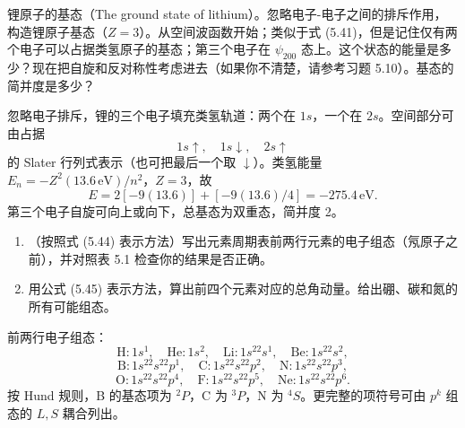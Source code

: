 \begin{question}
锂原子的基态（The ground state of lithium）。忽略电子-电子之间的排斥作用，构造锂原子基态（$Z=3$）。从空间波函数开始；类似于式 (5.41)，但是记住仅有两个电子可以占据类氢原子的基态；第三个电子在 $\psi_{200}$ 态上。这个状态的能量是多少？现在把自旋和反对称性考虑进去（如果你不清楚，请参考习题 5.10）。基态的简并度是多少？

\par\smallskip
{}

\end{question}
\begin{solution}

忽略电子排斥，锂的三个电子填充类氢轨道：两个在 $1s$，一个在 $2s$。空间部分可由占据
\[
1s\uparrow,
\quad 1s\downarrow,
\quad 2s\uparrow
\]
的 Slater 行列式表示（也可把最后一个取 $\downarrow$）。类氢能量 $E_n=-Z^2(13.6\,\mathrm{eV})/n^2$，$Z=3$，故
\[
E=2[-9(13.6)]+[-9(13.6)/4]
=-275.4\,\mathrm{eV}.
\]
第三个电子自旋可向上或向下，总基态为双重态，简并度 2。

\end{solution}

\begin{question}
\begin{enumerate}
\item （按照式 (5.44) 表示方法）写出元素周期表前两行元素的电子组态（氖原子之前），并对照表 5.1 检查你的结果是否正确。
\item 用公式 (5.45) 表示方法，算出前四个元素对应的总角动量。给出硼、碳和氮的所有可能组态。
\end{enumerate}

\par\smallskip
{}

\end{question}
\begin{solution}

前两行电子组态：
\[
\mathrm H:1s^1,
\quad \mathrm{He}:1s^2,
\quad \mathrm{Li}:1s^22s^1,
\quad \mathrm{Be}:1s^22s^2,
\]
\[
\mathrm B:1s^22s^22p^1,
\quad \mathrm C:1s^22s^22p^2,
\quad \mathrm N:1s^22s^22p^3,
\]
\[
\mathrm O:1s^22s^22p^4,
\quad \mathrm F:1s^22s^22p^5,
\quad \mathrm{Ne}:1s^22s^22p^6.
\]
按 Hund 规则，B 的基态项为 ${}^2P$，C 为 ${}^3P$，N 为 ${}^4S$。更完整的项符号可由 $p^k$ 组态的 $L,S$ 耦合列出。

\end{solution}

